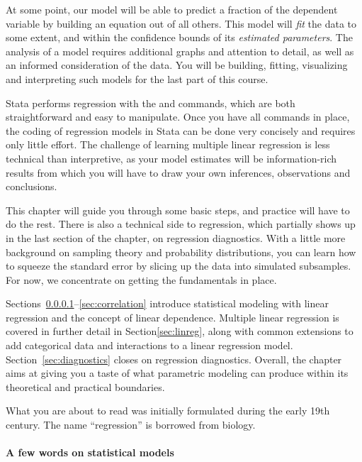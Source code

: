 At some point, our model will be able to predict a fraction of the dependent variable by building an equation out of all others. This model will \emph{fit} the data to some extent, and within the confidence bounds of its \emph{estimated parameters}. The analysis of a model requires additional graphs and attention to detail, as well as an informed consideration of the data. You will be building, fitting, visualizing and interpreting such models for the last part of this course.

Stata performs regression with the  and  commands, which are both straightforward and easy to manipulate. Once you have all commands in place, the coding of regression models in Stata can be done very concisely and requires only little effort. The challenge of learning multiple linear regression is less technical than interpretive, as your model estimates will be information-rich results from which you will have to draw your own inferences, observations and conclusions.

This chapter will guide you through some basic steps, and practice will have to do the rest. There is also a technical side to regression, which partially shows up in the last section of the chapter, on regression diagnostics. With a little more background on sampling theory and probability distributions, you can learn how to squeeze the standard error by slicing up the data into simulated subsamples. For now, we concentrate on getting the fundamentals in place.

Sections~\ref{sec:models}--\ref{sec:correlation} introduce statistical modeling with linear regression and the concept of linear dependence. Multiple linear regression is covered in further detail in Section\ref{sec:linreg}, along with common extensions to add categorical data and interactions to a linear regression model. Section~\ref{sec:diagnostics} closes on regression diagnostics. Overall, the chapter aims at giving you a taste of what parametric modeling can produce within its theoretical and practical boundaries.

What you are about to read was initially formulated during the early 19th century. The name ``regression'' is borrowed from biology.

%
%

\paragraph{A few words on statistical models}
\label{sec:models}

